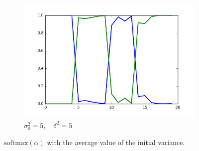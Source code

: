 \documentclass[12pt]{article}
\begin{document}
\begin{figure}[H]
\begin{subfigure}[b]{0.33\textwidth}
        \end{subfigure}%
        \begin{subfigure}[b]{0.33\textwidth}
                \includegraphics[width=\linewidth]{init-5_prop-5}
                \caption{$\sigma^2_0=5,\quad \delta^2=5$}
                \label{fig:tiger}
        \end{subfigure}
        \caption{$\mbox{softmax}(\alpha)$ with the average value of the initial variance.}\label{fig:animals}
\end{figure}
\end{document}
